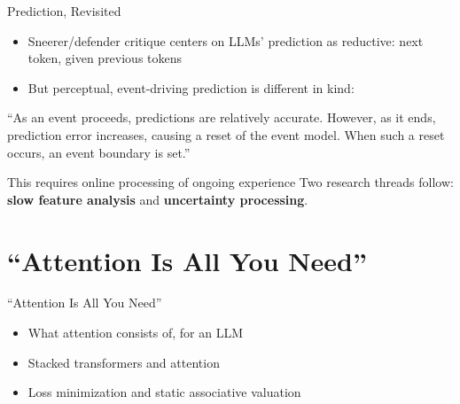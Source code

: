 \documentclass[aspectratio=169]{beamer}
\begin{document}
\begin{frame}{Prediction, Revisited}
  \begin{itemize}
    \item Sneerer/defender critique centers on LLMs' prediction as reductive: next token, given previous tokens
    \item<2-> But perceptual, event-driving prediction is different in kind:
  \end{itemize}

  \pause
  \vspace{1em}
  \begin{block}{}
    ``As an event proceeds, predictions are relatively accurate. However, as it ends, prediction error increases, causing a reset of the event model. When such a reset occurs, an event boundary is set.'' \parencite[p.~135]{miller2023eventsweaknarrativity}
  \end{block}

  \pause
  \vspace{1em}
  \begin{alertblock}{This requires online processing of ongoing experience}
    Two research threads follow: \textbf{slow feature analysis} and \textbf{uncertainty processing}.
  \end{alertblock}
\end{frame}

\section{``Attention Is All You Need''}

\begin{frame}{``Attention Is All You Need'' \parencite{vaswani2017attention}}
  \begin{itemize}
    \item What attention consists of, for an LLM
    \item Stacked transformers and attention
    \item Loss minimization and static associative valuation
  \end{itemize}
\end{frame}
\end{document}
